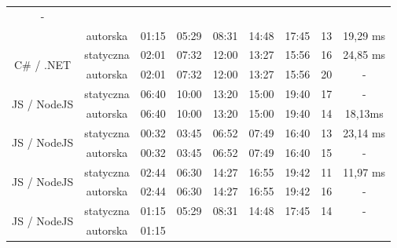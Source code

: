 \begin{longtable}[c]{|c|c|ccccc|c|c|}
    - \\ \cline{2-9} 
   &
    autorska &
    \multicolumn{1}{c|}{01:15} &
    \multicolumn{1}{c|}{05:29} &
    \multicolumn{1}{c|}{08:31} &
    \multicolumn{1}{c|}{14:48} &
    17:45 &
    13 &
    19,29 ms \\ \hline
  \multirow{2}{*}{C\# / .NET} &
    statyczna &
    \multicolumn{1}{c|}{02:01} &
    \multicolumn{1}{c|}{07:32} &
    \multicolumn{1}{c|}{12:00} &
    \multicolumn{1}{c|}{13:27} &
    15:56 &
    16 &
    24,85 ms \\ \cline{2-9} 
   &
    autorska &
    \multicolumn{1}{c|}{02:01} &
    \multicolumn{1}{c|}{07:32} &
    \multicolumn{1}{c|}{12:00} &
    \multicolumn{1}{c|}{13:27} &
    15:56 &
    20 &
    - \\ \hline
  \multirow{2}{*}{JS / NodeJS} &
    statyczna &
    \multicolumn{1}{c|}{06:40} &
    \multicolumn{1}{c|}{10:00} &
    \multicolumn{1}{c|}{13:20} &
    \multicolumn{1}{c|}{15:00} &
    19:40 &
    17 &
    - \\ \cline{2-9} 
   &
    autorska &
    \multicolumn{1}{c|}{06:40} &
    \multicolumn{1}{c|}{10:00} &
    \multicolumn{1}{c|}{13:20} &
    \multicolumn{1}{c|}{15:00} &
    19:40 &
    14 &
    18,13ms \\ \hline
  \multirow{2}{*}{JS / NodeJS} &
    statyczna &
    \multicolumn{1}{c|}{00:32} &
    \multicolumn{1}{c|}{03:45} &
    \multicolumn{1}{c|}{06:52} &
    \multicolumn{1}{c|}{07:49} &
    16:40 &
    13 &
    23,14 ms \\ \cline{2-9} 
   &
    autorska &
    \multicolumn{1}{c|}{00:32} &
    \multicolumn{1}{c|}{03:45} &
    \multicolumn{1}{c|}{06:52} &
    \multicolumn{1}{c|}{07:49} &
    16:40 &
    15 &
    - \\ \hline
  \multirow{2}{*}{JS / NodeJS} &
    statyczna &
    \multicolumn{1}{c|}{02:44} &
    \multicolumn{1}{c|}{06:30} &
    \multicolumn{1}{c|}{14:27} &
    \multicolumn{1}{c|}{16:55} &
    19:42 &
    11 &
    11,97 ms \\ \cline{2-9} 
   &
    autorska &
    \multicolumn{1}{c|}{02:44} &
    \multicolumn{1}{c|}{06:30} &
    \multicolumn{1}{c|}{14:27} &
    \multicolumn{1}{c|}{16:55} &
    19:42 &
    16 &
    - \\ \hline
  \multirow{2}{*}{JS / NodeJS} &
    statyczna &
    \multicolumn{1}{c|}{01:15} &
    \multicolumn{1}{c|}{05:29} &
    \multicolumn{1}{c|}{08:31} &
    \multicolumn{1}{c|}{14:48} &
    17:45 &
    14 &
    - \\ \cline{2-9} 
   &
    autorska &
    \multicolumn{1}{c|}{01:15} &

\end{longtable}
